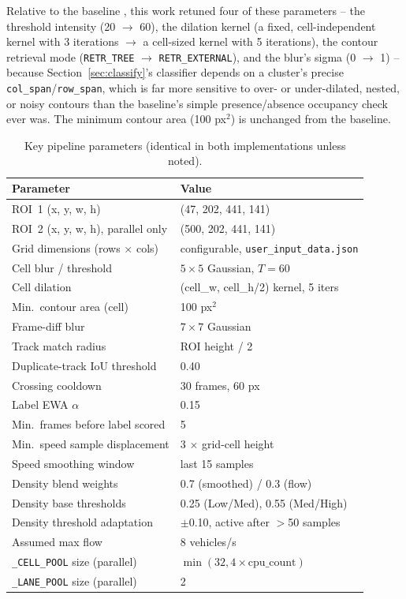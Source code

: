 \documentclass[conference]{IEEEtran}
\newcommand{\code}[1]{\texttt{#1}}
\begin{document}
Relative to the baseline \cite{baseline}, this work retuned four of
these parameters -- the threshold intensity (20 $\to$ 60), the dilation
kernel (a fixed, cell-independent kernel with 3 iterations $\to$ a
cell-sized kernel with 5 iterations), the contour retrieval mode
(\code{RETR\_TREE} $\to$ \code{RETR\_EXTERNAL}), and the blur's sigma
(0 $\to$ 1) -- because Section~\ref{sec:classify}'s classifier depends
on a cluster's precise \code{col\_span}/\code{row\_span}, which is far
more sensitive to over- or under-dilated, nested, or noisy contours
than the baseline's simple presence/absence occupancy check ever was.
The minimum contour area (100 px$^2$) is unchanged from the baseline.

\begin{table}[t]
\centering
\caption{Key pipeline parameters (identical in both implementations
unless noted).}
\label{tab:params}
\footnotesize
\begin{tabular}{p{3.6cm}p{3.9cm}}
\toprule
\textbf{Parameter} & \textbf{Value} \\
\midrule
ROI~1 (x, y, w, h) & (47, 202, 441, 141) \\
ROI~2 (x, y, w, h), parallel only & (500, 202, 441, 141) \\
Grid dimensions (rows $\times$ cols) & configurable, \code{user\_input\_data.json} \\
Cell blur / threshold & $5\times5$ Gaussian, $T{=}60$ \\
Cell dilation & (cell\_w, cell\_h/2) kernel, 5 iters \\
Min.\ contour area (cell) & 100 px$^2$ \\
Frame-diff blur & $7\times7$ Gaussian \\
Track match radius & ROI height / 2 \\
Duplicate-track IoU threshold & 0.40 \\
Crossing cooldown & 30 frames, 60 px \\
Label EWA $\alpha$ & 0.15 \\
Min.\ frames before label scored & 5 \\
Min.\ speed sample displacement & 3 $\times$ grid-cell height \\
Speed smoothing window & last 15 samples \\
Density blend weights & 0.7 (smoothed) / 0.3 (flow) \\
Density base thresholds & 0.25 (Low/Med), 0.55 (Med/High) \\
Density threshold adaptation & $\pm$0.10, active after $>$50 samples \\
Assumed max flow & 8 vehicles/s \\
\code{\_CELL\_POOL} size (parallel) & $\min(32, 4\times\text{cpu\_count})$ \\
\code{\_LANE\_POOL} size (parallel) & 2 \\
\bottomrule
\end{tabular}
\end{table}
\end{document}
